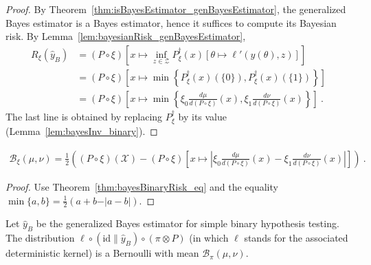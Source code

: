 \begin{proof}\leanok
{}
By Theorem~\ref{thm:isBayesEstimator_genBayesEstimator}, the generalized Bayes estimator is a Bayes estimator, hence it suffices to compute its Bayesian risk.
By Lemma~\ref{lem:bayesianRisk_genBayesEstimator},
\begin{align*}
R_\xi(\hat{y}_B)
&= (P \circ \xi)\left[x \mapsto \inf_{z \in \mathcal Z} P_\xi^\dagger(x) \left[\theta \mapsto \ell'(y(\theta), z)\right]\right]
\\
&= (P \circ \xi)\left[x \mapsto \min \left\{P_\xi^\dagger(x)(\{0\}), P_\xi^\dagger(x)(\{1\})\right\}\right]
\\
&= (P \circ \xi)\left[x \mapsto \min \left\{\xi_0\frac{d \mu}{d(P \circ \xi)}(x), \xi_1\frac{d \nu}{d(P \circ \xi)}(x)\right\}\right]
\: .
\end{align*}
The last line is obtained by replacing $P_\xi^\dagger$ by its value (Lemma~\ref{lem:bayesInv_binary}).
\end{proof}


\begin{corollary}
  \label{cor:bayesBinaryRisk_eq_abs}
  \leanok
  \begin{align*}
  \mathcal B_\xi(\mu, \nu) = \frac{1}{2}\left((P \circ \xi)(\mathcal X) -  (P \circ \xi)\left[x \mapsto \left\vert \xi_0\frac{d \mu}{d(P \circ \xi)}(x) - \xi_1\frac{d \nu}{d(P \circ \xi)}(x)\right\vert\right] \right)
  \: .
  \end{align*}
\end{corollary}

\begin{proof}\leanok
{}
Use Theorem~\ref{thm:bayesBinaryRisk_eq} and the equality $\min\{a,b\} = \frac{1}{2}(a + b - \vert a - b \vert)$.
\end{proof}


\begin{lemma}
  \label{lem:bayesBinaryRisk_bernoulli}
  Let $\hat{y}_B$ be the generalized Bayes estimator for simple binary hypothesis testing.
  The distribution $\ell \circ (\mathrm{id} \parallel \hat{y}_B) \circ (\pi \otimes P)$ (in which $\ell$ stands for the associated deterministic kernel) is a Bernoulli with mean $\mathcal B_\pi(\mu, \nu)$.
\end{lemma}


